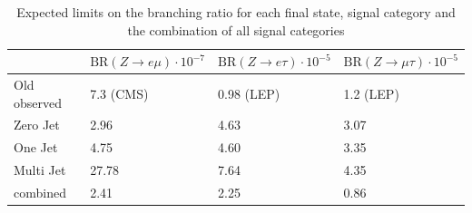 \begin{table}[htp]
	\centering
	\caption[Expected limits on the branching ratio]{Expected limits on the branching ratio for each final state, signal category and the combination of all signal categories}
	\label{tab:tab_1_2}
        \begin{tabular}{|l|l|l|l|}
        \hline
		& $\text{BR}(Z\to e\mu) \cdot 10^{-7}$ & $\text{BR}(Z\to e\tau) \cdot 10^{-5}$ & $\text{BR}(Z\to\mu\tau) \cdot 10^{-5}$ \\ \hline
		Old observed  & 7.3  (CMS)	& 0.98      (LEP) & 1.2   (LEP)               \\ \hline
		Zero Jet      & 2.96 		& 4.63 		& 3.07                  \\ \hline
		One Jet      & 4.75  		& 4.60		& 3.35                  \\ \hline
		Multi Jet     & 27.78 		& 7.64 		& 4.35              \\ \hline
		combined     & 2.41 		& 2.25 		& 0.86                  \\ \hline
	\end{tabular}
\end{table}













